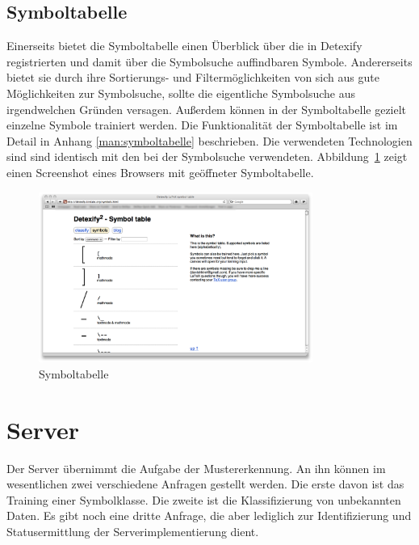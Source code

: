 
\subsection{Symboltabelle} %
\label{sub:symboltabelle}

Einerseits bietet die Symboltabelle einen Überblick über die in Detexify registrierten und damit über die Symbolsuche auffindbaren Symbole. Andererseits bietet sie durch ihre Sortierungs- und Filtermöglichkeiten von sich aus gute Möglichkeiten zur Symbolsuche, sollte die eigentliche Symbolsuche aus irgendwelchen Gründen versagen. Außerdem können in der Symboltabelle gezielt einzelne Symbole trainiert werden. Die Funktionalität der Symboltabelle ist im Detail in Anhang \ref{man:symboltabelle} beschrieben. Die verwendeten Technologien sind sind identisch mit den bei der Symbolsuche verwendeten.
 Abbildung~\ref{fig:symboltabelle} zeigt einen Screenshot eines Browsers mit geöffneter Symboltabelle.

\begin{figure}[htbp]
  \centering \includegraphics[width=0.8\textwidth]{figures/interface-symbol-table.png}
  \caption{Symboltabelle}
  \label{fig:symboltabelle}
\end{figure}



\section{Server} %
\label{sec:server}

Der Server übernimmt die Aufgabe der Mustererkennung. An ihn können im wesentlichen zwei verschiedene Anfragen gestellt werden. Die erste davon ist das Training einer Symbolklasse. Die zweite ist die Klassifizierung von unbekannten Daten. Es gibt noch eine dritte Anfrage, die aber lediglich zur Identifizierung und Statusermittlung der Serverimplementierung dient.

